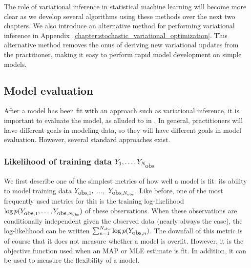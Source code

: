 The role of variational inference in statistical machine learning will
become more clear as we develop several algorithms using these methods
over the next two chapters.  We also introduce an alternative
method for performing variational inference in
Appendix~\ref{chapter:stochastic_variational_optimization}.  This
alternative method removes the onus of deriving new variational
updates from the practitioner, making it easy to perform rapid model
development on simple models.


\subsection{Model evaluation}
After a model has been fit with an approach such as variational
inference, it is important to evaluate the model, as alluded to in
.  In general, practitioners will have
different goals in modeling data, so they will have different goals in
model evaluation.  However, several standard approaches exist.

\subsubsection{Likelihood of training data $Y_1, \ldots,
  Y_{N_{\mbox{\small obs}}}$}
We first describe one of the simplest metrics of how well a model is fit:
its ability to model training data $Y_{\mbox{\small obs},1},$
$\ldots,$ $Y_{\mbox{\small obs},N_{\mbox{\tiny obs}}}$.  Like before,
one of the most frequently used metrics for this is the training
log-likelihood $\log p(Y_{\mbox{\small obs},1}, \ldots,
Y_{\mbox{\small obs},N_{\mbox{\tiny obs}}})$ of these
observations. When these observations are conditionally independent
given the observed data (nearly always the case), the log-likelihood
can be written $\sum_{n=1}^{N_{\mbox{\tiny obs}}} \log
p(Y_{\mbox{\small obs},n})$.  The downfall of this metric is of course
that it does not measure whether a model is overfit.  However, it is
the objective function used when an MAP or MLE estimate is
fit.  In addition, it can be used to measure the flexibility of a model.

